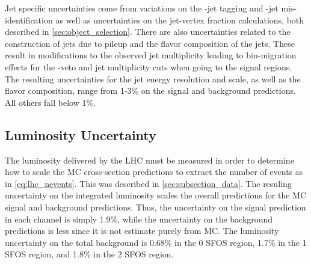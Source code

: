 Jet specific uncertainties come from variations on the \bee-jet tagging
and \bee-jet mis-identification as well as uncertainties on the jet-vertex
fraction calculations, both described in \sec\ref{sec:object_selection}. There
are also uncertainties related to the construction of jets due to pileup
and the flavor composition of the jets. These result in modifications
to the observed jet multiplicity leading to bin-migration effects 
for the \bee-veto and jet multiplicity cuts when going to the signal regions.
The resulting uncertainties for the jet energy resolution and scale, as well
as the flavor composition, range from 1-3\% on the signal and background 
predictions. All others fall below 1\%.



\subsection{Luminosity Uncertainty}
The luminosity delivered by the LHC must be measured in order to determine
how to scale the MC cross-section
predictions to extract the number of events as in \eqn\eqref{eq:lhc_nevents}.
This was described in \sec\ref{sec:subsection_data}. The resuling
uncertainty on the integrated luminosity scales the overall predictions
for the MC signal and background predictions. Thus, the uncertainty 
on the signal prediction in each channel is simply 1.9\%, while the uncertainty
on the background predictions is less since it is not estimate purely from 
MC. The luminosity uncertainty on the total background is
0.68\% in the 0 SFOS region, 1.7\% in the 1 SFOS region, 
and 1.8\% in the 2 SFOS region.
